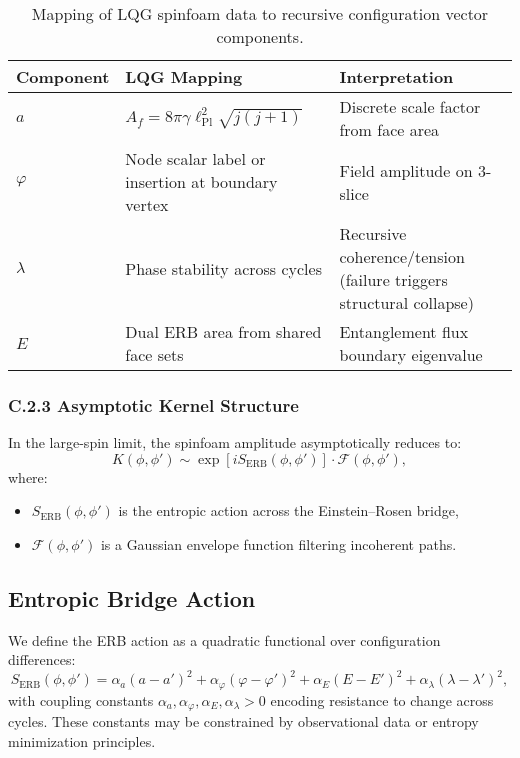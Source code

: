 \begin{table}[H]
\centering
\begin{tabular}{lll}
\toprule
\textbf{Component} & \textbf{LQG Mapping} & \textbf{Interpretation} \\
\midrule
\( a \) & \( A_f = 8\pi \gamma \ell_{\text{Pl}}^2 \sqrt{j(j+1)} \) & Discrete scale factor from face area \\
\( \varphi \) & Node scalar label or insertion at boundary vertex & Field amplitude on 3-slice \\
\( \lambda \) & Phase stability across cycles & Recursive coherence/tension (failure triggers structural collapse) \\
\( E \) & Dual ERB area from shared face sets & Entanglement flux boundary eigenvalue \\
\bottomrule
\end{tabular}
\caption{Mapping of LQG spinfoam data to recursive configuration vector components.}
\end{table}

\subsubsection*{C.2.3 Asymptotic Kernel Structure}

In the large-spin limit, the spinfoam amplitude asymptotically reduces to:
\[
K(\phi, \phi') \sim \exp\left[i S_{\text{ERB}}(\phi, \phi')\right] \cdot \mathcal{F}(\phi, \phi'),
\]
where:
\begin{itemize}
  \item \( S_{\text{ERB}}(\phi, \phi') \) is the entropic action across the Einstein--Rosen bridge,
  \item \( \mathcal{F}(\phi, \phi') \) is a Gaussian envelope function filtering incoherent paths.
\end{itemize}

\subsection*{Entropic Bridge Action}

We define the ERB action as a quadratic functional over configuration differences:
\[
S_{\text{ERB}}(\phi, \phi') = \alpha_a (a - a')^2 + \alpha_\varphi (\varphi - \varphi')^2 + \alpha_E (E - E')^2 + \alpha_\lambda (\lambda - \lambda')^2,
\]
with coupling constants \(\alpha_a, \alpha_\varphi, \alpha_E, \alpha_\lambda > 0\) encoding resistance to change across cycles. These constants may be constrained by observational data or entropy minimization principles.


